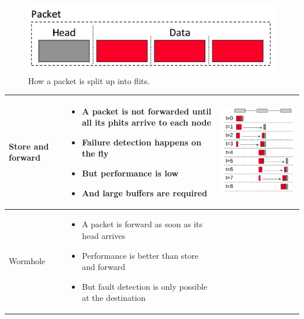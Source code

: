\begin{figure}[h]
  \centering
  \includegraphics[width=0.5\linewidth]{images/flits}
  \caption{How a packet is split up into flits.}
  \label{flits}
\end{figure}

\begin{center}
  \begin{tabular}{| m{2cm} | m{5cm} | c |}
    \hline
    Store and forward &
    \begin{itemize}
      \item A packet is not forwarded until all its phits arrive to each node
      \item Failure detection happens on the fly
      \item But performance is low
      \item And large buffers are required
    \end{itemize} & 
    \begin{minipage}{.3\textwidth}
      \begin{center}
        \includegraphics[width=0.5\linewidth]{images/store-and-forward}
      \end{center}
    \end{minipage} \\ \hline
    Wormhole &
    \begin{itemize}
      \item A packet is forward as soon as its head arrives
      \item Performance is better than store and forward
      \item But fault detection is only possible at the destination

\end{itemize}
\end{tabular}
\end{center}
